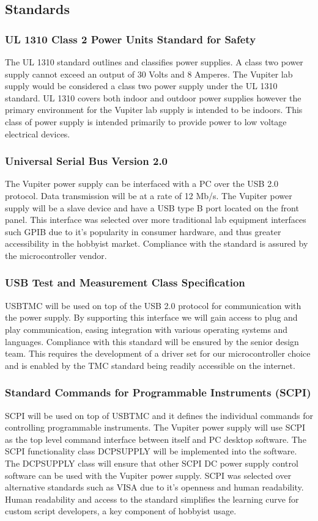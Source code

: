 \documentclass[12pt]{article}
\begin{document}
\subsection{Standards}
\subsubsection{UL 1310 Class 2 Power Units Standard for Safety}
The UL 1310 standard outlines and classifies power supplies. A class two power 
supply cannot exceed an output of 30 Volts and 8 Amperes. The Vupiter lab supply 
would be considered a class two power supply under the UL 1310 standard.
UL 1310 covers both indoor and outdoor power supplies however the primary environment
for the Vupiter lab supply is intended to be indoors. This class of power supply is 
intended primarily to provide power to low voltage electrical devices. 

\subsubsection{Universal Serial Bus Version 2.0}
The Vupiter power supply can be interfaced with a PC over the USB 2.0 protocol. Data 
transmission will be at a rate of 12 Mb/s. The Vupiter power supply will be a slave
device and have a USB type B port located on the front panel. This interface was selected over more traditional lab equipment interfaces such GPIB due to it's popularity in consumer hardware, and thus greater accessibility in the hobbyist market. Compliance with the standard is assured by the microcontroller vendor.

\subsubsection{USB Test and Measurement Class Specification}
USBTMC will be used on top of the USB 2.0 protocol for communication with the power supply. By supporting this interface we will gain access to plug and play communication, easing integration with various operating systems and languages. Compliance with this standard will be ensured by the senior design team. This requires the development of a driver set for our microcontroller choice and is enabled by the TMC standard being readily accessible on the internet.

\subsubsection{Standard Commands for Programmable Instruments (SCPI)}
SCPI will be used on top of USBTMC and it defines the individual commands for controlling programmable instruments. The Vupiter power supply will use SCPI as the top level command interface between itself and PC desktop software. The SCPI functionality class DCPSUPPLY will be implemented into the software. The DCPSUPPLY class will ensure that other SCPI DC power supply control software can be used with the Vupiter power supply. SCPI was selected over alternative standards such as VISA due to it's openness and human readability. Human readability and access to the standard simplifies the learning curve for custom script developers, a key component of hobbyist usage.
\end{document}
